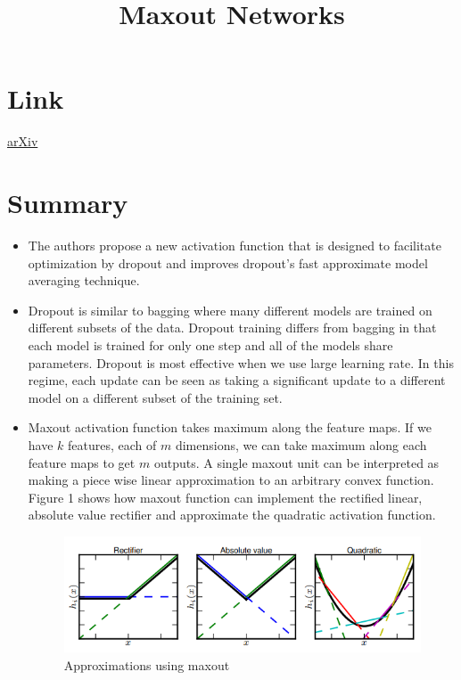 \documentclass{article}
\title{Maxout Networks}
\author{}
\date{}
\begin{document}
\maketitle

\section*{Link}
\href{https://arxiv.org/pdf/1302.4389}{arXiv} 

\section*{Summary}
\begin{itemize}
    \item The authors propose a new activation function that is designed to facilitate optimization by dropout and improves dropout's fast approximate model averaging technique.
    \item Dropout is similar to bagging where many different models are trained on different subsets of the data. Dropout training differs from bagging in that each model is trained for only one step and all of the models share parameters. Dropout is most effective when we use large learning rate. In this regime, each update can be seen as taking a significant update to a different model on a different subset of the training set.
    \item Maxout activation function takes maximum along the feature maps. If we have $k$ features, each of $m$ dimensions, we can take maximum along each feature maps to get $m$ outputs. A single maxout unit can be interpreted as making a piece wise linear approximation to an arbitrary convex function. Figure 1 shows how maxout function can implement the rectified linear, absolute value rectifier and approximate the quadratic activation function. 
    \begin{figure}[H]
        \centering
        \includegraphics[scale=0.7]{maxout_approximation.png}
        \caption{Approximations using maxout}
        \label{fig:Figure 1}
    \end{figure}

\end{itemize}
\end{document}
